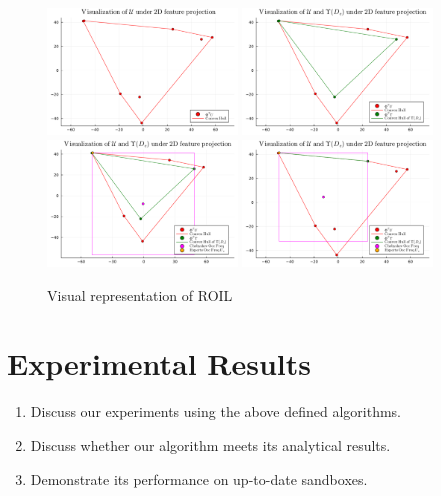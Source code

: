 \documentclass[11pt]{uai2023}
\begin{document}
\begin{figure}[htbp]
	\centering
	\includegraphics[width=0.45\textwidth]{../notebooks/plots/visual_U.pdf}
	\includegraphics[width=0.45\textwidth]{../notebooks/plots/visual_U_and_Upsilon.pdf}
	\includegraphics[width=0.45\textwidth]{../notebooks/plots/visual_solve_cheb.pdf}
	\includegraphics[width=0.45\textwidth]{../notebooks/plots/visual_solve_cheb_outside_upsilon.pdf}
	\caption{Visual representation of ROIL}
	\label{fig:visual_representation_of_ROIL}
\end{figure}

\section{Experimental Results}
\begin{enumerate}
	\item Discuss our experiments using the above defined algorithms.
	\item Discuss whether our algorithm meets its analytical results.
	\item Demonstrate its performance on up-to-date sandboxes.
\end{enumerate}
\end{document}
